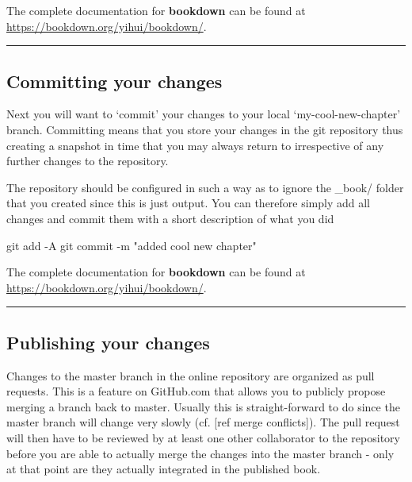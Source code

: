 \documentclass[]{book}
\newenvironment{Shaded}{\begin{snugshade}}{\end{snugshade}}
\newcommand{\StringTok}[1]{\textcolor[rgb]{0.31,0.60,0.02}{#1}}
\newcommand{\FunctionTok}[1]{\textcolor[rgb]{0.00,0.00,0.00}{#1}}
\newcommand{\NormalTok}[1]{#1}
\begin{document}
The complete documentation for \textbf{bookdown} can be found at
\url{https://bookdown.org/yihui/bookdown/}.

\begin{center}\rule{0.5\linewidth}{\linethickness}\end{center}

\subsection{Committing your changes}\label{committing-your-changes}

Next you will want to `commit' your changes to your local
`my-cool-new-chapter' branch. Committing means that you store your
changes in the git repository thus creating a snapshot in time that you
may always return to irrespective of any further changes to the
repository.

The repository should be configured in such a way as to ignore the
\_book/ folder that you created since this is just output. You can
therefore simply add all changes and commit them with a short
description of what you did

\begin{Shaded}
\begin{Highlighting}[]
\FunctionTok{git}\NormalTok{ add -A}
\FunctionTok{git}\NormalTok{ commit -m }\StringTok{"added cool new chapter"}
\end{Highlighting}
\end{Shaded}

The complete documentation for \textbf{bookdown} can be found at
\url{https://bookdown.org/yihui/bookdown/}.

\begin{center}\rule{0.5\linewidth}{\linethickness}\end{center}

\subsection{Publishing your changes}\label{publishing-your-changes}

Changes to the master branch in the online repository are organized as
pull requests. This is a feature on GitHub.com that allows you to
publicly propose merging a branch back to master. Usually this is
straight-forward to do since the master branch will change very slowly
(cf. {[}ref merge conflicts{]}). The pull request will then have to be
reviewed by at least one other collaborator to the repository before you
are able to actually merge the changes into the master branch - only at
that point are they actually integrated in the published book.
\end{document}
